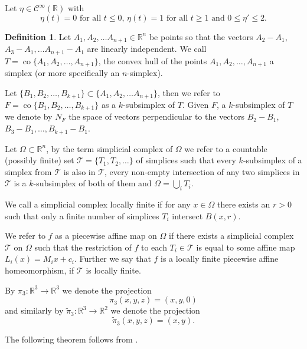 \documentclass[12pt,a4paper]{amsart}
\theoremstyle{plain}
\theoremstyle{definition}
\newtheorem{definition}[thm]{Definition}
\numberwithin{equation}{section}
\def\co{\operatorname{co}}
\def\T{\mathcal{T}}
\def\er{\mathbb R}
\def\rn{\mathbb R^n}
\begin{document}
	Let $\eta\in\mathcal{C}^\infty(\er)$ with 
	\begin{equation}\label{Beef}
		\eta(t) = 0 \text{ for all } t\leq 0, \, \eta(t)= 1 \text{ for all } t\geq 1 \text{ and } 0\leq \eta'\leq 2.
	\end{equation}
	\begin{definition}\label{SimplexDef}
		Let $A_1, A_2, \dots A_{n+1} \in  \rn$ be points so that the vectors $A_2 - A_1$, $A_3-A_1, \dots A_{n+1}-A_1$ are linearly independent. We call $T = \co \{A_1, A_2, \dots, A_{n+1}\}$, the convex hull of the points $A_1, A_2, \dots, A_{n+1}$ a simplex (or more specifically an $n$-simplex).
		
		Let $\{B_1, B_2, \dots, B_{k+1}\} \subset \{A_1, A_2, \dots A_{n+1}\}$, then we refer to $F =\co \{B_1, B_2, \dots, B_{k+1}\}$ as a $k$-subsimplex of $T$. Given $F$, a $k$-subsimplex of $T$ we denote by $N_F$ the space of vectors perpendicular to the vectors $B_2-B_1$, $B_3-B_1, \dots, B_{k+1}- B_1$.
		
		Let $\Omega\subset \rn$, by the term simplicial complex of $\Omega$ we refer to a countable (possibly finite) set $\T = \{T_1, T_2, \dots\}$ of simplices such that every $k$-subsimplex of a simplex from $\T$ is also in $\T$, every non-empty intersection of any two simplices in $\T$ is a $k$-subsimplex of both of them and $\Omega = \bigcup_{i} T_i$.
		
		We call a simplicial complex locally finite if for any $x\in \Omega$ there exists an $r>0$ such that only a finite number of simplices $T_i$ intersect $B(x,r)$.
		
		We refer to $f$ as a piecewise affine map on $\Omega$ if there exists a simplicial complex $\T$ on $\Omega$ such that the restriction of $f$ to each $T_i \in\T$ is equal to some affine map $L_i(x) = M_ix + c_i$. Further we say that $f$ is a locally finite piecewise affine homeomorphism, if $\T$ is locally finite.
	\end{definition}
	
	By $\pi_3:\er^3 \to \er^3$ we denote the projection
	$$
	\pi_3(x,y,z) = (x,y,0)
	$$
	and similarly by $\tilde{\pi}_3:\er^3 \to \er^2$ we denote the projection
	$$
	\tilde{\pi}_3(x,y,z) = (x,y).
	$$
	
	The following theorem follows from \cite[Theorem 6]{S}.
	
\end{document}
